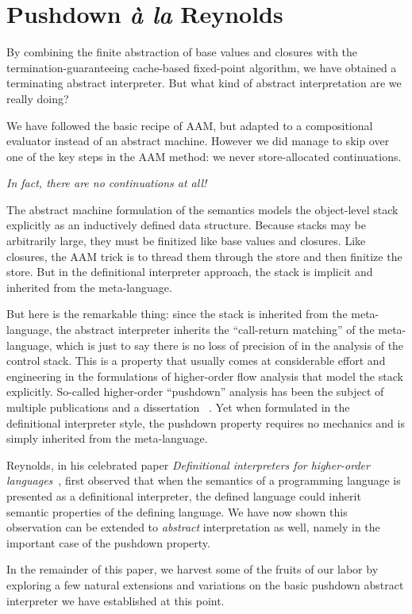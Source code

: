 \section{Pushdown \emph{à la} Reynolds}

By combining the finite abstraction of base values and closures with
the termination-guaranteeing cache-based fixed-point algorithm, we
have obtained a terminating abstract interpreter.  But what kind of
abstract interpretation are we really doing?  

We have followed the basic recipe of AAM, but adapted to a
compositional evaluator instead of an abstract machine.  However we
did manage to skip over one of the key steps in the AAM method:
we never store-allocated continuations.
\begin{center}
\emph{In fact, there are no continuations at all!}
\end{center}
The abstract machine formulation of the semantics models the
object-level stack explicitly as an inductively defined data
structure.  Because stacks may be arbitrarily large, they must be
finitized like base values and closures.  Like closures, the AAM trick
is to thread them through the store and then finitize the store.  But
in the definitional interpreter approach, the stack is implicit and
inherited from the meta-language.

But here is the remarkable thing: since the stack is inherited from
the meta-language, the abstract interpreter inherits the ``call-return
matching'' of the meta-language, which is just to say there is no loss
of precision of in the analysis of the control stack.  This is a
property that usually comes at considerable effort and engineering in
the formulations of higher-order flow analysis that model the stack
explicitly.  So-called higher-order ``pushdown'' analysis has been the
subject of multiple publications and a dissertation~\cite%
{dvanhorn:Vardoulakis2011CFA2%
,dvanhorn:Earl2010Pushdown%
,local:vardoulakis-diss12%
,dvanhorn:VanHorn2012Systematic%
,dvanhorn:Earl2012Introspective%
,dvanhorn:Johnson2014Abstracting%
,dvanhorn:Johnson2014Pushdown%
,local:p4f%
}%
.  Yet when formulated in the definitional interpreter style, the pushdown
property requires no mechanics and is simply inherited from the meta-language.

Reynolds, in his celebrated paper \emph{Definitional interpreters for
higher-order languages}~\cite{dvanhorn:reynolds-acm72}, first observed that when
the semantics of a programming language is presented as a definitional
interpreter, the defined language could inherit semantic properties of
the defining language.  We have now shown this observation can be
extended to \emph{abstract} interpretation as well, namely in the
important case of the pushdown property.

In the remainder of this paper, we harvest some of the fruits of our
labor by exploring a few natural extensions and variations on the
basic pushdown abstract interpreter we have established at this point.
